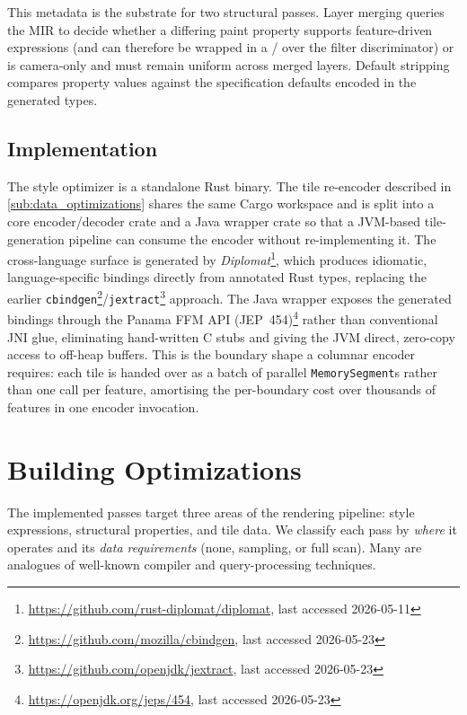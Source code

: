 This metadata is the substrate for two structural passes.
Layer merging queries the MIR to decide whether a differing paint property supports feature-driven expressions (and can therefore be wrapped in a /  over the filter discriminator) or is camera-only and must remain uniform across merged layers.
Default stripping compares property values against the specification defaults encoded in the generated types.

\subsection{Implementation}\label{sub:implementation}

The style optimizer is a standalone Rust binary.
The tile re-encoder described in \cref{sub:data_optimizations} shares the same Cargo workspace and is split into a core encoder/decoder crate and a Java wrapper crate so that a \ac{JVM}-based tile-generation pipeline can consume the encoder without re-implementing it.
The cross-language surface is generated by \emph{Diplomat}\footnote{\url{https://github.com/rust-diplomat/diplomat}, last accessed 2026-05-11}, which produces idiomatic, language-specific bindings directly from annotated Rust types, replacing the earlier \texttt{cbindgen}\footnote{\url{https://github.com/mozilla/cbindgen}, last accessed 2026-05-23}/\texttt{jextract}\footnote{\url{https://github.com/openjdk/jextract}, last accessed 2026-05-23} approach.
The Java wrapper exposes the generated bindings through the Panama \ac{FFM} \ac{API} (JEP~454)\footnote{\url{https://openjdk.org/jeps/454}, last accessed 2026-05-23} rather than conventional \ac{JNI} glue, eliminating hand-written C stubs and giving the \ac{JVM} direct, zero-copy access to off-heap buffers.
This is the boundary shape a columnar encoder requires: each tile is handed over as a batch of parallel \texttt{MemorySegment}s rather than one call per feature, amortising the per-boundary cost over thousands of features in one encoder invocation.

\section{Building Optimizations}\label{sec:building_optimizations}

The implemented passes target three areas of the rendering pipeline: style expressions, structural properties, and tile data.
We classify each pass by \emph{where} it operates and its \emph{data requirements} (none, sampling, or full scan).
Many are analogues of well-known compiler and query-processing techniques.

